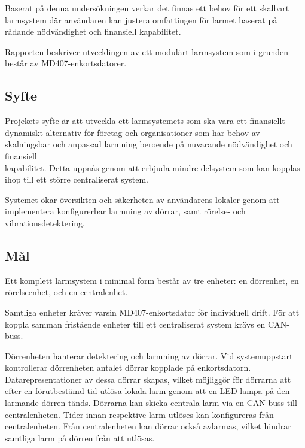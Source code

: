 \documentclass{article}
\begin{document}
Baserat på denna undersökningen verkar det finnas ett behov för ett skalbart larmsystem där användaren kan justera omfattingen för larmet baserat på rådande nödvändighet och finansiell kapabilitet.

Rapporten beskriver utvecklingen av ett modulärt larmsystem som i grunden består av MD407-enkortsdatorer.

\subsection{Syfte} %
Projekets syfte är att utveckla ett larmsystemets som ska vara ett finansiellt dynamiskt alternativ för företag
och organisationer som har behov av skalningsbar och anpassad larmning beroende på nuvarande nödvändighet och finansiell \\ kapabilitet.
Detta uppnås genom att erbjuda mindre delsystem som kan kopplas ihop till ett större centraliserat system.

Systemet ökar översikten och säkerheten av användarens lokaler genom att implementera konfigurerbar larmning av dörrar, samt rörelse- och vibrationsdetektering.

\subsection{Mål} %
Ett komplett larmsystem i minimal form består av tre enheter: en dörrenhet, en rörelseenhet, och en centralenhet.

Samtliga enheter kräver varsin MD407-enkortsdator för individuell drift. För att koppla samman
fristående enheter till ett centraliserat system krävs en CAN-buss.

Dörrenheten hanterar detektering och larmning av dörrar. Vid systemuppstart kontrollerar
dörrenheten antalet dörrar kopplade på enkortsdatorn. Datarepresentationer av dessa dörrar skapas, vilket möjliggör för dörrarna att efter en förutbestämd tid utlösa lokala larm genom att en LED-lampa på den larmande dörren tänds.
Dörrarna kan skicka centrala larm via en CAN-buss till centralenheten. Tider innan respektive larm utlöses kan konfigureras från centralenheten.
Från centralenheten kan dörrar också avlarmas, vilket hindrar samtliga larm på dörren från att utlösas.
\end{document}
